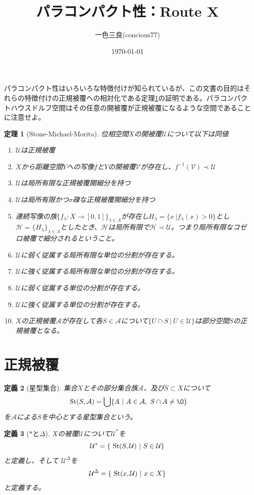 \documentclass[leqno]{jsarticle}
\title{パラコンパクト性：Route X}
\author{一色三良(concious77)}
\date{\today}
\newtheorem{thm}{定理}
\newtheorem{df}[thm]{定義}
\newcommand{\la}{\lambda}
\newcommand{\La}{\Lambda}
\newcommand{\uu}{\mathcal{U}}
\newcommand{\vv}{\mathcal{V}}
\newcommand{\A}{\mathcal{A}}
\newcommand{\s}{\text{  {\rm St}} }
\begin{document}
\maketitle
パラコンパクト性はいろいろな特徴付けが知られているが、この文書の目的はそれらの特徴付けの正規被覆への相対化である定理\ref{main}の証明である。パラコンパクトハウスドルフ空間はその任意の開被覆が正規被覆になるような空間であることに注意せよ。

\begin{thm}[Stone-Michael-Morita]\label{main}
位相空間$X$の開被覆$\uu$について以下は同値
\begin{enumerate}
\item $\uu$は正規被覆
\item $X$から距離空間$Y$への写像$f$と$Y$の開被覆$\vv$が存在し、$f^{-1}(\vv)\prec \uu$
\item $\uu$は局所有限な正規被覆開細分を持つ
\item $\uu$は局所有限かつ$\sigma$疎な正規被覆開細分を持つ
\item 連続写像の族$\{f_{\la}:X\to[0,1]\}_{\la\in \La}$が存在し$H_{\la}=\{x\ | f_{\la}(x)>0\}$とし$\mathcal{H}=\{H_{\la}\}_{\la\in \La}$としたとき、$\mathcal{H}$は局所有限で$\mathcal{H\prec \uu}$。つまり局所有限なコゼロ被覆で細分されるということ。
\item $\uu$に弱く従属する局所有限な単位の分割が存在する。
\item $\uu$に強く従属する局所有限な単位の分割が存在する。
\item $\uu$に弱く従属する単位の分割が存在する。
\item $\uu$に強く従属する単位の分割が存在する。
\item $X$の正規被覆$\A$が存在して各$S\in \A$について$\{U\cap S\ |\ U\in \uu\}$は部分空間$S$の正規被覆となる。
\end{enumerate}

\end{thm}

\section{正規被覆}

\begin{df}[星型集合]
集合$X$とその部分集合族$\mathcal{A}$、及び$S\subset X$について
\[
\s(S,\mathcal{A})=\bigcup\{A\ |\ A\in \mathcal{A},\ S\cap A\neq\O\}
\]
を$\mathcal{A}$による$S$を中心とする星型集合という。
\end{df}

\begin{df}[$*$と$\Delta$]
$X$の被覆$\uu$について$\uu^{*}$を
\[
\uu^{*}=\{\s(S,\uu)\ |\ S\in \uu\}
\]
と定義し、そして
$\uu^{\Delta}$を
\[
\uu^{\Delta}=\{\s(x,\uu)\ |\ x\in X\}
\]
と定義する。
\end{df}
\end{document}
